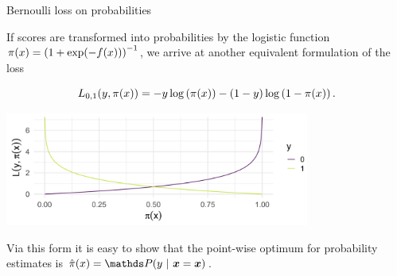 \begin{vbframe}{Bernoulli loss on probabilities}

If scores are transformed into probabilities by the logistic function  $\pi(x) = \left(1 + \exp(- f(x))\right)^{-1}$, we arrive at another equivalent formulation of the loss

  $$
    L_{0,1}(y, \pi(x)) = - y \log \left(\pi(x)\right) - (1 - y) \log \left(1 - \pi(x)\right). 
  $$

\begin{center}
\includegraphics[width = 10cm ]{figure_man/bernoulli-loss.png} \\
\end{center}

Via this form it is easy to show that the point-wise optimum for probability estimates is $\pixh = \P(y~|~\xv = \xv)$.

\end{vbframe}



